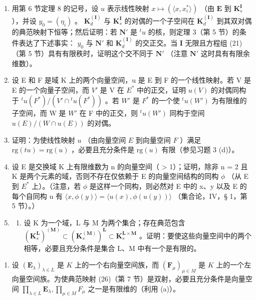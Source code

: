 \begin{enumerate}
\def\labelenumi{\arabic{enumi}.}
\setcounter{enumi}{20}
\item
  用第 6 节定理 8 的记号，设 \(u\) 表示线性映射 \(x \mapsto (\langle x, x_i^* \rangle)\) （由 \(\mathbf{E}\) 到 \(\mathbf{K}_s^{\mathbf{I}}\) ），并设 \(y_0 = (\eta_i)\) 。 \(\mathbf{K}_d^{(\mathbf{I})}\) 与 \(\mathbf{K}_s^{\mathbf{I}}\) 的对偶的一个子空间在 \(\mathbf{K}_d^{(\mathbf{I})}\) 到其双对偶的典范映射下恒等；然后证明：若 \(\mathbf{N}'\) 是 \(^t u\) 的核，则定理 3（第 5 节）的条件表达了下述事实： \(y_0\) 与 \(\mathbf{N}'\) 和 \(\mathbf{K}_d^{(\mathbf{I})}\) 的交正交。当 \(\mathbf{I}\) 无限且方程组 (21)（第 5 节）具有有限秩时，证明这个交不同于 \(\mathbf{N}'\) （注意 \(\mathbf{N}'\) 这时具有有限余维数）。
\item
  设 E 和 F 是域 K 上的两个向量空间，u 是 E 到 F 的一个线性映射。若 V 是 E 的一个向量子空间，而 \(V'\) 是 V 在 \(E^{*}\) 中的正交，证明 \(u(V)\) 的对偶同构于 \({}^{t}u(F^{*})/(V'\cap{}^{t}u(F^{*}))\) 。若 \(W'\) 是 \(F^{*}\) 的一个使 \({}^{t}u(W')\) 为有限维的子空间，而 W 是 \(W'\) 在 F 中的正交，则 \({}^{t}u(W')\) 同构于空间 \(u(E)/(W\cap u(E))\) 的对偶。
\item
  证明：为使线性映射 \(u\) （由向量空间 \(E\) 到向量空间 \(F\) ）满足 \(\mathrm{rg}(t u) = \mathrm{rg}(u)\) ，必要且充分条件是 \(\mathrm{rg}(u)\) 有限（参见习题 3 (d)）。
\item
  设 E 是交换域 K 上有限维数为 n 的向量空间（ \textgreater{} 1）；证明，除非 n = 2 且 K 是两个元素的域，否则不存在仅依赖于 E 的向量空间结构的同构 \(\phi\) （从 E 到 \(E^{*}\) 上）。（注意，若 \(\phi\) 是这样一个同构，则必然对 E 中的 x、y 以及 E 的每个自同构 u 有 \(\langle x, \phi(y) \rangle = \langle u(x), \phi(u(y)) \rangle\) （集合论，IV，§ 1，第 5 节）。）
\item
  \begin{enumerate}
  \def\labelenumii{(\alph{enumii})}
  \tightlist
  \item
    设 K 为一个域，L 与 M 为两个集合；存在典范包含 \((\mathbf{K}_{s}^{\mathbf{L}})^{(\mathbf{M})}\subset(\mathbf{K}_{s}^{(\mathbf{M})})^{\mathbf{L}}\subset\mathbf{K}_{s}^{\mathbf{L}\times\mathbf{M}}\) 。证明：要使这些向量空间中的两个相等，必要且充分条件是集合 L、M 中有一个是有限的。
  \end{enumerate}
\end{enumerate}

\begin{enumerate}
\def\labelenumi{(\alph{enumi})}
\setcounter{enumi}{1}
\tightlist
\item
  设 \((\mathbf{E}_{\lambda})_{\lambda \in L}\) 是 \(K\) 上的一个右向量空间族，而 \((\mathbf{F}_{\mu})_{\mu \in M}\) 是 \(K\) 上的一个左向量空间族。为使典范映射 (26)（第 7 节）是双射，必要且充分条件是向量空间 \(\prod_{\lambda \in L} \mathbf{E}_{\lambda}, \prod_{\mu \in M} F_{\mu}\) 之一是有限维的（利用 (a)）。
\end{enumerate}

